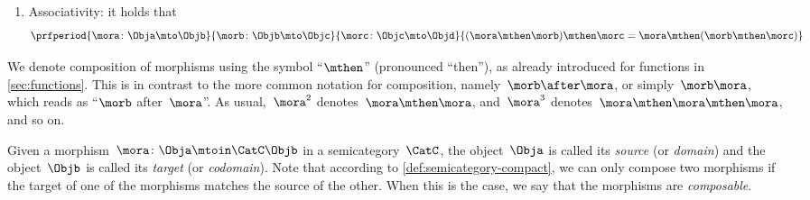 \begin{ctdefinition}[Semicategory]
\begin{body}
\begin{enumerate}
        \end{enumerate}
        \condit
        \begin{enumerate}
            \item Associativity: it holds that
                  \begin{equation*}
                      \prfperiod{
                          \mora\colon \Obja \mto \Objb
                      }{
                          \morb\colon \Objb \mto \Objc
                      }{
                          \morc\colon \Objc \mto \Objd
                      }{
                          (\mora\mthen \morb)
                          \mthen \morc= \mora \mthen (\morb \mthen \morc)
                      }
                  \end{equation*}
        \end{enumerate}
    \end{body}
\end{ctdefinition}

\begin{remark}
    We denote composition of morphisms using the symbol ``$\mthen$'' (pronounced ``then''), as already introduced for functions in \cref{sec:functions}.
    This is in contrast to the more common notation for composition, namely~$\morb\after \mora$, or simply~$\morb \mora$, which reads as ``$\morb$ after~$\mora$''.
    As usual,~$\mora^2$ denotes~$\mora \mthen \mora$, and~$\mora^3$ denotes~$\mora \mthen \mora \mthen \mora$, and so on.
\end{remark}


Given a morphism~$\mora \colon \Obja \mtoin\CatC \Objb$ in a semicategory~$\CatC$, the object~$\Obja$ is called its \emph{source} (or \emph{domain}) and the object~$\Objb$ is called its \emph{target} (or \emph{codomain}).
Note that according to \cref{def:semicategory-compact}, we can only compose two morphisms if the target of one of the morphisms matches the source of the other.
When this is the case, we say that the morphisms are \emph{composable}.


